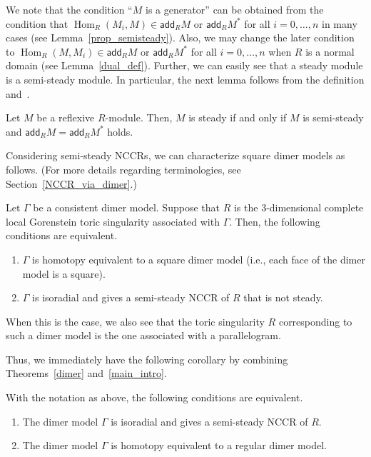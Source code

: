 \documentclass[ALCO,ThmDefs,Unicode]{cedram}
\DeclareMathOperator{\Hom}{Hom}
\newcommand{\add}{\mathsf{add}}
\newcommand*{\MK}{\mkern 2mu}
\begin{document}
We note that the condition ``$M$ is a generator'' can be obtained from the condition that $\Hom_R(M_i,M)\in\add_RM$ or $\add_RM^*$ for all $i=0,\dots,n$ in many cases (see Lemma~\ref{prop_semisteady}). Also, we may change the later condition to $\Hom_R(M,M_i)\in\add_RM$ or $\add_RM^*$ for all $i=0,\dots,n$ when $R$ is a normal domain (see Lemma~\ref{dual_def}). Further, we can easily see that a steady module is a semi-steady module. In particular, the next lemma follows from the definition and~\cite[Lemma~2.5$\MK$(b)]{IN}.

\begin{lemm}\label{semisteady_iff_steady}
Let $M$ be a reflexive $R$-module. Then, $M$ is steady if and only if $M$ is semi-steady and $\add_RM=\add_RM^*$ holds.
\end{lemm}

Considering semi-steady NCCRs, we can characterize square dimer models as follows. (For more details regarding terminologies, see Section~\ref{NCCR_via_dimer}.)

\begin{theo}\label{main_intro}
Let $\Gamma$ be a consistent dimer model. Suppose that $R$ is the $3$-dimensional complete local Gorenstein toric singularity associated with $\Gamma$. Then, the following conditions are equivalent.
\begin{enumerate}%
\item $\Gamma$ is homotopy equivalent to a square dimer model (i.e., each face of the dimer model is a square).
\item $\Gamma$ is isoradial and gives a semi-steady NCCR of $R$ that is not steady.
\end{enumerate}
When this is the case, we also see that the toric singularity $R$ corresponding to such a dimer model is the one associated with a parallelogram.
\end{theo}

Thus, we immediately have the following corollary by combining Theorems~\ref{dimer} and~\ref{main_intro}.

\begin{coro}\label{main_cor_intro}
With the notation as above, the following conditions are equivalent.
\begin{enumerate}%
\item The dimer model $\Gamma$ is isoradial and gives a semi-steady NCCR of $R$.
\item The dimer model $\Gamma$ is homotopy equivalent to a regular dimer model.
\end{enumerate}
\end{coro}
\end{document}
